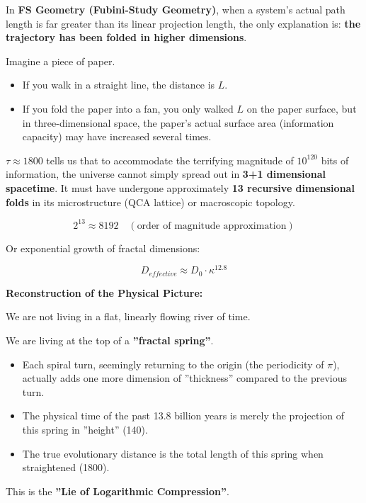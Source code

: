In \textbf{FS Geometry (Fubini-Study Geometry)}, when a system's actual path length is far greater than its linear projection length, the only explanation is: \textbf{the trajectory has been folded in higher dimensions}.

Imagine a piece of paper.

\begin{itemize}
\item If you walk in a straight line, the distance is $L$.

\item If you fold the paper into a fan, you only walked $L$ on the paper surface, but in three-dimensional space, the paper's actual surface area (information capacity) may have increased several times.
\end{itemize}

$\tau \approx 1800$ tells us that to accommodate the terrifying magnitude of $10^{120}$ bits of information, the universe cannot simply spread out in \textbf{3+1 dimensional spacetime}. It must have undergone approximately \textbf{13 recursive dimensional folds} in its microstructure (QCA lattice) or macroscopic topology.

$$2^{13} \approx 8192 \quad (\text{order of magnitude approximation})$$

Or exponential growth of fractal dimensions:

$$D_{effective} \approx D_0 \cdot \kappa^{12.8}$$

\textbf{Reconstruction of the Physical Picture:}

We are not living in a flat, linearly flowing river of time.

We are living at the top of a \textbf{''fractal spring''}.

\begin{itemize}
\item Each spiral turn, seemingly returning to the origin (the periodicity of $\pi$), actually adds one more dimension of ''thickness'' compared to the previous turn.

\item The physical time of the past 13.8 billion years is merely the projection of this spring in ''height'' (140).

\item The true evolutionary distance is the total length of this spring when straightened (1800).
\end{itemize}

This is the \textbf{''Lie of Logarithmic Compression''}.

